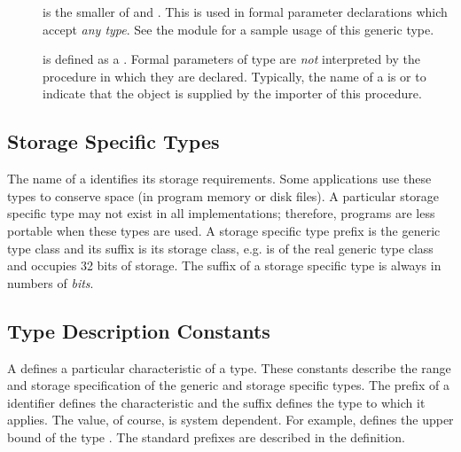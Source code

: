 \begin{description}
\item[]
    is the smaller of  and
    .
    This  is used in formal parameter
    declarations which accept {\em any type}.  See the module
     for a sample usage of this generic type.

\item[]
    is defined as a .
    Formal parameters of type  are {\em not}
    interpreted by the procedure in which they are declared.
    Typically, the name of a  is
     or 
    to indicate that the object is supplied by the importer
    of this procedure.

\end{description}


\subsection{Storage Specific Types}

The name of a  identifies its
storage requirements.  Some applications use these types
to conserve space (in program memory or disk files).  A particular
storage specific type may not exist in all implementations; therefore,
programs are less portable when these types are used.   A storage
specific type prefix is the generic type class and its suffix
is its storage class, e.g.  is of the real
generic type class and occupies 32 bits of storage.  The suffix
of a storage specific type is always in numbers of {\em bits}.

\subsection{Type Description Constants}

A  defines a particular characteristic
of a type.  These constants describe the range and storage specification
of the generic and storage specific types.
The prefix of a
 identifier defines the characteristic and
the suffix defines the type to which it applies.  The value, of course,
is system dependent.
For example,  defines the upper bound of
the type .   The standard prefixes are described
in the  definition.

